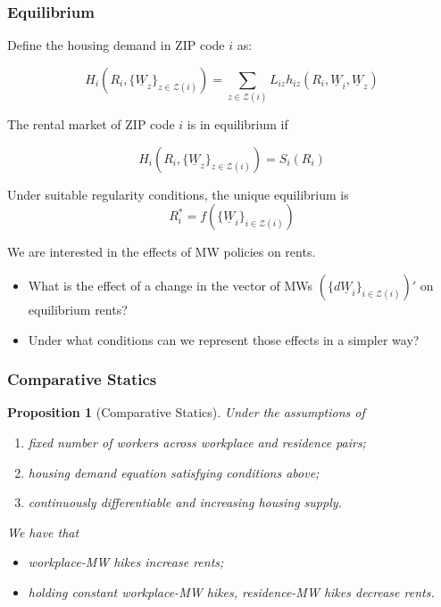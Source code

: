 \documentclass[aspectratio=169, t]{beamer}
\newtheorem{prop}{Proposition}
\newcommand{\Z}{\mathcal{Z}}
\newcommand{\MW}{\underline{W}}
\begin{document}
\begin{frame}
    \frametitle{Equilibrium}
    
    Define the housing demand in ZIP code $i$ as:
    
     \[
     H_{i} (R_i, \{\MW_z\}_{z\in\Z(i)}) = \sum_{z\in\Z(i)} L_{iz} h_{iz} (R_i, \MW_i, \MW_z)
     \]
    
    The rental market of ZIP code $i$ is in equilibrium if
    
    $$ H_{i} (R_i, \{\MW_z\}_{z\in\Z(i)}) = S_i(R_i) $$
    
    Under suitable regularity conditions, the unique equilibrium is 
    $$R^*_i = f(\{\MW_i\}_{i\in\Z(i)})$$
    
    \vspace{3mm}
    \pause
    We are interested in the effects of MW policies on rents.
    \vspace{1mm}
    \begin{itemize} \small
        \item What is the effect of a change in the vector of MWs 
        $(\{d \MW_i\}_{i\in\Z(i)})'$ on equilibrium rents?
        \item Under what conditions can we represent those effects in a simpler way?
    \end{itemize}
\end{frame}

\begin{frame}[label = prop_comp_stat]
    \frametitle{Comparative Statics}
    
    \begin{prop}[Comparative Statics]\label{prop:comparative_statics}
        Under the assumptions of
        \begin{enumerate}
           \item fixed number of workers across workplace and residence pairs;
           \item housing demand equation satisfying conditions above; 
           \item continuously differentiable and increasing housing supply.
        \end{enumerate} 
        We have that
        \begin{itemize}
            \item workplace-MW hikes increase rents;
            \item holding constant workplace-MW hikes, residence-MW hikes decrease rents.
        \end{itemize}
    \end{prop}
\end{frame}
\end{document}
